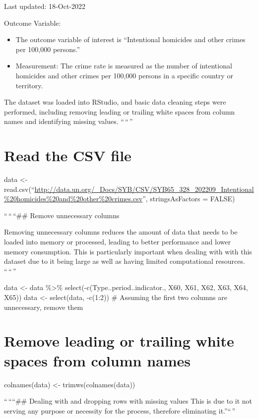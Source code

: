 \documentclass[
]{article}
\providecommand{\tightlist}{%
  \setlength{\itemsep}{0pt}\setlength{\parskip}{0pt}}
\begin{document}
Last updated: 18-Oct-2022

Outcome Variable:

\begin{itemize}
\tightlist
\item
  The outcome variable of interest is ``Intentional homicides and other
  crimes per 100,000 persons.''
\item
  Measurement: The crime rate is measured as the number of intentional
  homicides and other crimes per 100,000 persons in a specific country
  or territory.
\end{itemize}

The dataset was loaded into RStudio, and basic data cleaning steps were
performed, including removing leading or trailing white spaces from
column names and identifying missing values. ``\,``\,''

\hypertarget{read-the-csv-file}{%
\section{Read the CSV file}\label{read-the-csv-file}}

data \textless-
read.csv(``\url{http://data.un.org/_Docs/SYB/CSV/SYB65_328_202209_Intentional\%20homicides\%20and\%20other\%20crimes.csv}'',
stringsAsFactors = FALSE)

``\,``\,``\#\# Remove unnecessary columns

Removing unnecessary columns reduces the amount of data that needs to be
loaded into memory or processed, leading to better performance and lower
memory consumption. This is particularly important when dealing with
with this dataset due to it being large as well as having limited
computational resources. ``\,``\,''

data \textless- data \%\textgreater\%
select(-c(Type..period..indicator., X60, X61, X62, X63, X64, X65)) data
\textless- select(data, -c(1:2)) \# Assuming the first two columns are
unnecessary, remove them

\hypertarget{remove-leading-or-trailing-white-spaces-from-column-names}{%
\section{Remove leading or trailing white spaces from column
names}\label{remove-leading-or-trailing-white-spaces-from-column-names}}

colnames(data) \textless- trimws(colnames(data))

``\,````\#\# Dealing with and dropping rows with missing values This is
due to it not serving any purpose or necessity for the process,
therefore eliminating it.''``\,''
\end{document}
